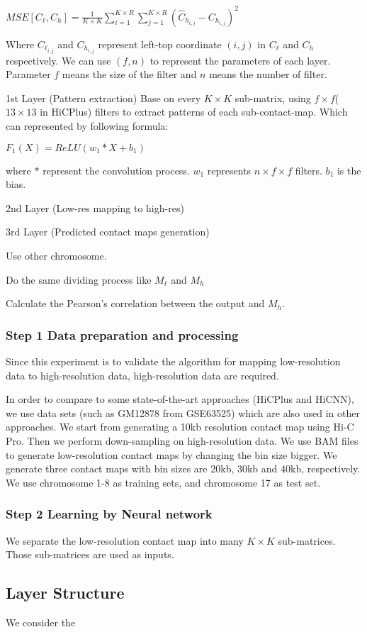\documentclass{article}
\begin{document}
\begin{center}
    $MSE[C_\ell, C_h] = \frac{1}{K \times K} \sum_{i=1}^{K \times R} \sum_{j=1}^{K \times R} (\hat{C}_{h_{i,j}}-C_{h_{i,j}})^2$
\end{center}
Where $C_{\ell_{i,j}}$ and $C_{h_{i,j}}$ represent left-top coordinate $(i,j)$ in $C_\ell$ and $C_h$ respectively.
\noindent We can use $(f,n)$ to represent the parameters of each layer. Parameter $f$ means the size of the filter and $n$ means the number of filter. 

\noindent 1st Layer (Pattern extraction)
Base on every $K \times K$ sub-matrix, using $f \times f$( $13 \times 13$ in HiCPlus) filters
to extract patterns of each sub-contact-map. Which can represented by following formula:
\begin{center}
$F_1(X) = ReLU(w_1 * X + b_1)$
\end{center}
where $*$ represent the convolution process. $w_1$ represents $n \times f \times f$ filters. 
$b_1$ is the bias.
 

\noindent 2nd Layer (Low-res mapping to high-res)

\noindent 3rd Layer (Predicted contact maps generation)


Use other chromosome. 

Do the same dividing process like $M_\ell$ and $M_h$

Calculate the Pearson's correlation between the output and $M_h$.







\subsubsection*{Step 1 Data preparation and processing}
Since this experiment is to validate the algorithm for mapping low-resolution data to high-resolution data, 
high-resolution data are required. 

In order to compare to some state-of-the-art approaches (HiCPlus and HiCNN), 
we use data sets (such as GM12878 from GSE63525) which are also used in other approaches. 
We start from generating a 10kb resolution contact map 
using Hi-C Pro. 
Then we perform down-sampling on high-resolution data. 
We use BAM files to generate low-resolution contact maps by changing the bin size bigger. 
We generate three contact maps with bin sizes are 20kb, 30kb and 40kb, respectively. 
We use chromosome 1-8 as training sets, and chromosome 17 as test set.

\subsubsection*{Step 2 Learning by Neural network}
We separate the low-resolution contact map into many $K \times K$ sub-matrices. 
Those sub-matrices are used as inputs.

\subsection{Layer Structure}
We consider the 





 
\end{document}
